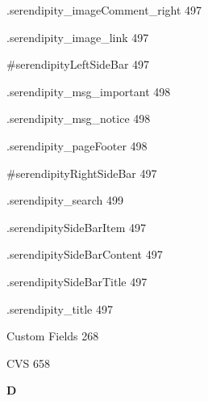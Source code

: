 \documentclass{book}
\renewcommand\indexspace{\vspace{11pt}}
\renewcommand\subitem{\par}
\begin{document}
\begin{multicols}{2}
\begin{osp-index}
    \subitem .serendipity\_imageComment\_right\hspace{1mm} 497
    \subitem .serendipity\_image\_link\hspace{1mm} 497
    \subitem \#serendipityLeftSideBar\hspace{1mm} 497
    \subitem .serendipity\_msg\_important\hspace{1mm} 498
    \subitem .serendipity\_msg\_notice\hspace{1mm} 498
    \subitem .serendipity\_pageFooter\hspace{1mm} 498
    \subitem \#serendipityRightSideBar\hspace{1mm} 497
    \subitem .serendipity\_search\hspace{1mm} 499
    \subitem .serendipitySideBarItem\hspace{1mm} 497
    \subitem .serendipitySideBarContent\hspace{1mm} 497
    \subitem .serendipitySideBarTitle\hspace{1mm} 497
    \subitem .serendipity\_title\hspace{1mm} 497
  \item Custom Fields\hspace{1mm} 268
  \item CVS\hspace{1mm} 658

  \indexspace
{\sffamily\bfseries D}\nopagebreak


\end{osp-index}
\end{multicols}
\end{document}
